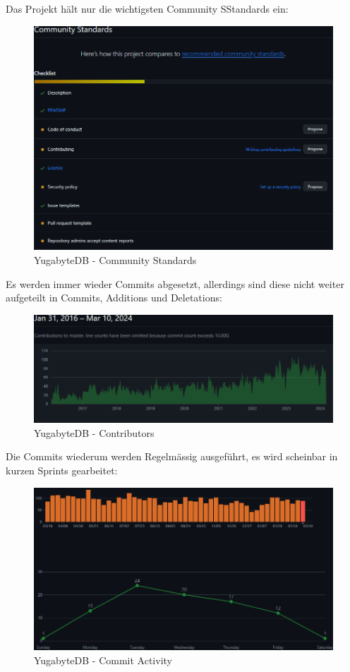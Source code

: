\begin{flushleft}
    Das Projekt hält nur die wichtigsten Community SStandards ein:
    \begin{figure}[H]
        \centering
        \includegraphics[width=0.75\linewidth]{source/implementation/evaluation/postgresql_ha_solutions/insights/yugabytedb/community Standards}
        \caption{YugabyteDB - Community Standards}
        \label{fig:community Standards_yugabyte-db}
    \end{figure}

    Es werden immer wieder Commits abgesetzt, allerdings sind diese nicht weiter aufgeteilt in Commits, Additions und Deletations:
    \begin{figure}[H]
        \centering
        \includegraphics[width=0.75\linewidth]{source/implementation/evaluation/postgresql_ha_solutions/insights/yugabytedb/contributors_to_yugabyte_yugabyte-db}
        \caption{YugabyteDB - Contributors}
        \label{fig:contributors_to_yugabyte_yugabyte-db}
    \end{figure}

    Die Commits wiederum werden Regelmässig ausgeführt, es wird scheinbar in kurzen Sprints gearbeitet:
    \begin{figure}[H]
        \centering
        \includegraphics[width=0.75\linewidth]{source/implementation/evaluation/postgresql_ha_solutions/insights/yugabytedb/commit_activity_yugabyte_yugabyte-db}
        \caption{YugabyteDB - Commit Activity}
        \label{fig:commit_activity_yugabyte_yugabyte-db}
    \end{figure}


\end{flushleft}
